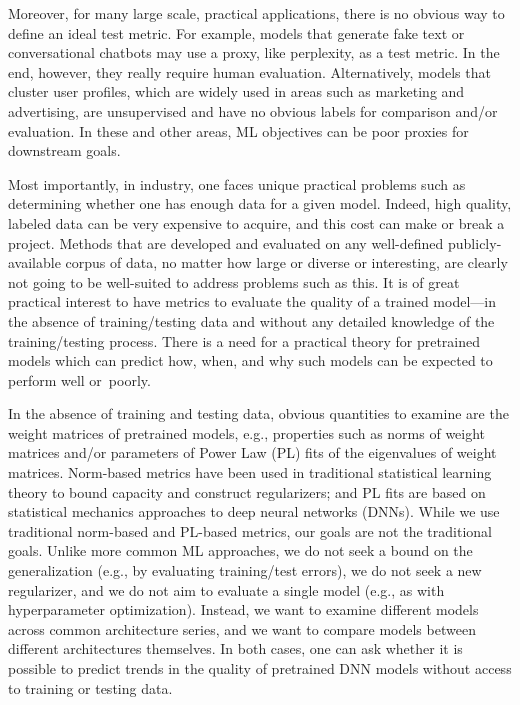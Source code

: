 \documentclass{article}
\begin{document}
Moreover, for many large scale, practical applications, there is no obvious way to define an ideal test metric. 
For example, models that generate fake text or conversational chatbots may use a proxy, like perplexity, as a test metric.
In the end, however, they really require human evaluation. 
Alternatively, models that cluster user profiles, which are widely used in areas such as marketing and advertising, are unsupervised and have no obvious labels for comparison and/or evaluation.
In these and other areas, ML objectives can be poor proxies for downstream goals.

Most importantly, in industry, one faces unique practical problems such as determining whether one has enough data for a given model. 
Indeed, high quality, labeled data can be very expensive to acquire, and this cost can make or break a project.
Methods that are developed and evaluated on any well-defined publicly-available corpus of data, no matter how large or diverse or interesting, are clearly not going to be well-suited to address problems such as this.
It is of great practical interest to have metrics to evaluate the quality of a trained model---in the absence of training/testing data and without any detailed knowledge of the training/testing process.  
There is a need for a practical theory for pretrained models which can predict how, when, and why such models can be expected to perform well or~poorly.

In the absence of training and testing data, obvious quantities to examine are the weight matrices of pretrained models, e.g., 
properties such as norms of weight matrices and/or parameters of Power Law (PL) fits of the eigenvalues of weight matrices.
Norm-based metrics have been used in traditional statistical learning theory to bound capacity and construct regularizers; and PL fits are based on statistical mechanics approaches to deep neural networks (DNNs).
While we use traditional norm-based and PL-based metrics, our goals are not the traditional goals.
Unlike more common ML approaches, we do not seek a bound on the generalization (e.g., by evaluating training/test errors), we do not seek a new regularizer, and we do not aim to evaluate a single model (e.g., as with hyperparameter optimization).
Instead, we want to examine different models across common architecture series, and we want to compare models between different architectures themselves.
In both cases, one can ask whether it is possible to predict trends in the quality of pretrained DNN models without access to training or testing data.  
\end{document}
